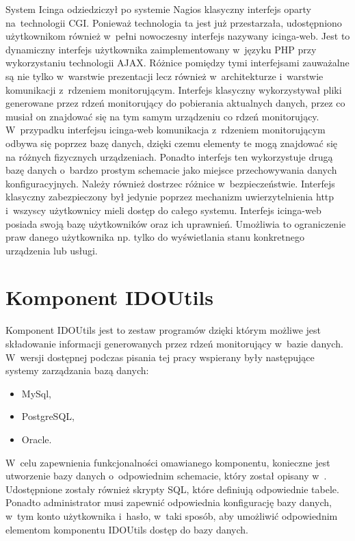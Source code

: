 System Icinga odziedziczył po systemie Nagios klasyczny interfejs
oparty na~technologii CGI. Ponieważ technologia ta jest już
przestarzała, udostępniono użytkownikom również w~pełni nowoczesny
interfejs nazywany icinga-web. Jest to dynamiczny interfejs
użytkownika zaimplementowany w~języku PHP przy wykorzystaniu
technologii AJAX. Różnice pomiędzy tymi interfejsami zauważalne są nie
tylko w~warstwie prezentacji lecz również w~architekturze i~warstwie
komunikacji z~rdzeniem monitorującym. Interfejs klasyczny
wykorzystywał pliki generowane przez rdzeń monitorujący do pobierania
aktualnych danych, przez co musiał on znajdować się na tym samym
urządzeniu co rdzeń monitorujący. W~przypadku interfejsu icinga-web
komunikacja z~rdzeniem monitorującym odbywa się poprzez bazę danych,
dzięki czemu elementy te mogą znajdować się na różnych fizycznych
urządzeniach. Ponadto interfejs ten wykorzystuje drugą bazę danych
o~bardzo prostym schemacie jako miejsce przechowywania danych
konfiguracyjnych. Należy również dostrzec różnice
w~bezpieczeństwie. Interfejs klasyczny zabezpieczony był jedynie
poprzez mechanizm uwierzytelnienia http i~wszyscy użytkownicy mieli
dostęp do całego systemu. Interfejs icinga-web posiada swoją bazę
użytkowników oraz ich uprawnień. Umożliwia to ograniczenie praw danego
użytkownika np. tylko do wyświetlania stanu konkretnego urządzenia lub
usługi.

\section[Komponent IDOUtils][Komponent IDOUtils]{Komponent IDOUtils}
\label{sec:IDOUtils}

Komponent IDOUtils jest to zestaw programów dzięki którym możliwe jest
składowanie informacji generowanych przez rdzeń monitorujący w~bazie
danych. W~wersji dostępnej podczas pisania tej pracy wspierany były
następujące systemy zarządzania bazą danych:

\begin{itemize}
\item MySql,
\item PostgreSQL,
\item Oracle.
\end{itemize}

W~celu zapewnienia funkcjonalności omawianego komponentu, konieczne
jest utworzenie bazy danych o~odpowiednim schemacie, który został
opisany w~\cite[669-750]{www:IcingaDoc}. Udostępnione zostały również
skrypty SQL, które definiują odpowiednie tabele. Ponadto administrator
musi zapewnić odpowiednia konfigurację bazy danych, w~tym konto
użytkownika i~hasło, w~taki sposób, aby umożliwić odpowiednim
elementom komponentu IDOUtils dostęp do bazy danych.

